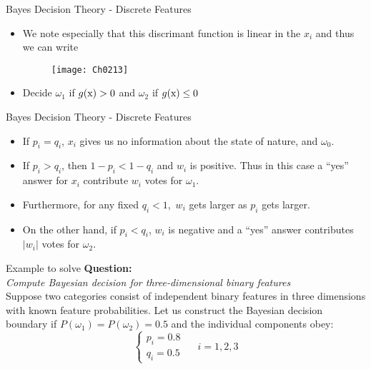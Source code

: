 \begin{frame}{Bayes Decision Theory - Discrete Features}
\begin{itemize}
\item We note especially that this discrimant function is linear in the $x_i$ and thus we can write
\begin{figure}
\texttt{[image: Ch0213]}
\end{figure}
\item Decide $\omega_1$ if $g({\rm x})>0$ and $\omega_2$ if $g({\rm x})\leq 0$
\end{itemize}
\end{frame}

\begin{frame}{Bayes Decision Theory - Discrete Features}
\begin{itemize}
\item If $p_i=q_i$, $x_i$ gives us no information about the state of nature, and $\omega_0$.
\item If $p_i>q_i$, then $1-p_i<1-q_i$ and $w_i$ is positive. Thus in this case a ``yes'' answer for $x_i$ contribute $w_i$ votes for $\omega_1$.
\item Furthermore, for any fixed $q_i<1$,~$w_i$ gets larger as $p_i$ gets larger.
\item On the other hand, if $p_i<q_i$, $w_i$ is negative and a ``yes'' answer contributes $|w_i|$ votes for $\omega_2$.
\end{itemize}
\end{frame}

\begin{frame}{Example to solve}
\textbf{\color{blue} Question:}\\
\textit{\color{mycolor2}Compute Bayesian decision for three-dimensional binary features}\\
Suppose two categories consist of independent binary features in three dimensions
with known feature probabilities. Let us construct the Bayesian decision boundary if
$P(\omega_1 ) = P(\omega_2 )=0.5$ and the individual components obey:
\begin{equation}
\left\{ {\begin{array}{*{20}{c}}
{{p_i} = 0.8}\\
{{q_i} = 0.5}
\end{array}} \right.~~~~~~i = 1,2,3\nonumber
\end{equation}
\vspace{2.5cm}
\end{frame}

